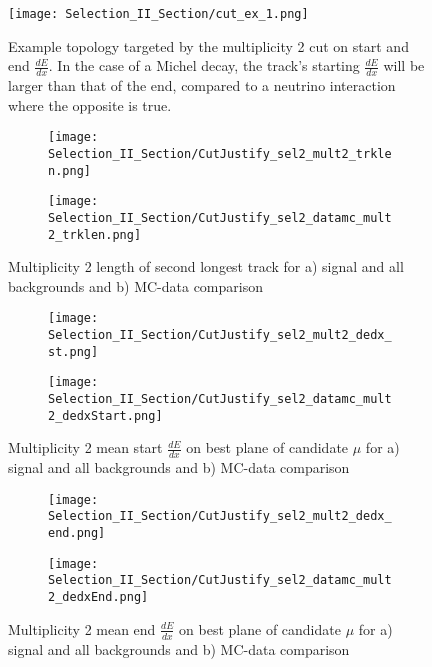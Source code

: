 \begin{figure}[H]
  \centering
  \texttt{[image: Selection\_II\_Section/cut\_ex\_1.png]}
  \caption{Example topology targeted by the multiplicity 2 cut on start and end $\frac{dE}{dx}$.  In the case of a Michel decay, the track's starting $\frac{dE}{dx}$ will be larger than that of the end, compared to a neutrino interaction where the opposite is true. }
\label{fig:cut_ex_1}
\end{figure}

\begin{figure}[H]
\centering
  \begin{subfigure}[t]{0.4\textwidth}
    \centering
    \texttt{[image: Selection\_II\_Section/CutJustify\_sel2\_mult2\_trklen.png]}
    \caption{ }
  \end{subfigure} 
  \hspace{20mm}
  \begin{subfigure}[t]{0.4\textwidth}
    \centering
    \texttt{[image: Selection\_II\_Section/CutJustify\_sel2\_datamc\_mult2\_trklen.png]}
    \caption{ }
  \end{subfigure} 

\caption{Multiplicity 2 length of second longest track for a) signal and all backgrounds and b) MC-data comparison }
\label{fig:cutjust_sel2_mult2_secondtrklen}
\end{figure}

\begin{figure}[H]
\centering
  \begin{subfigure}[t]{0.4\textwidth}
    \centering
\texttt{[image: Selection\_II\_Section/CutJustify\_sel2\_mult2\_dedx\_st.png]}
    \caption{ }
  \end{subfigure} 
  \hspace{20mm}
  \begin{subfigure}[t]{0.4\textwidth}
    \centering
\texttt{[image: Selection\_II\_Section/CutJustify\_sel2\_datamc\_mult2\_dedxStart.png]}
    \caption{ }
  \end{subfigure} 
\caption{Multiplicity 2 mean start $\frac{dE}{dx}$ on best plane of candidate $\mu$ for a) signal and all backgrounds and b) MC-data comparison }
\label{fig:cutjust_sel2_mult2_dedxst}
\end{figure}

\begin{figure}[H]
\centering
  \begin{subfigure}[t]{0.4\textwidth}
    \centering
\texttt{[image: Selection\_II\_Section/CutJustify\_sel2\_mult2\_dedx\_end.png]}
    \caption{ }
  \end{subfigure} 
  \hspace{20mm}
  \begin{subfigure}[t]{0.4\textwidth}
    \centering
\texttt{[image: Selection\_II\_Section/CutJustify\_sel2\_datamc\_mult2\_dedxEnd.png]}
  \caption{ }
  \end{subfigure} 
  
\caption{Multiplicity 2 mean end $\frac{dE}{dx}$ on best plane of candidate $\mu$ for a) signal and all backgrounds and b) MC-data comparison }
\label{fig:cutjust_sel2_mult2_dedxend}
\end{figure}

